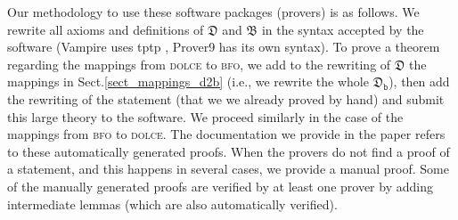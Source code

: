 \documentclass[ao]{iosart2x}
\newcommand{\nb}[1]{\textcolor{red}{$|$}\marginpar{\hspace*{-0cm}\parbox{20mm}{\scriptsize\raggedright\textcolor{red}{#1}}}}
\newcommand{\dolce}{{\textsc{dolce}}}
\newcommand{\bfo}{{\textsc{bfo}}}
\newcommand {\thdolce} {\ensuremath{\mathfrak{D}}}
\newcommand {\thbfo} {\ensuremath{\mathfrak{B}}}
\newcommand {\thdolcedbmap} {\ensuremath{\mathfrak{D}_\texttt{b}}}
\begin{document}

Our methodology to use these software packages (provers) is as follows. We rewrite all axioms and definitions of {$\thdolce$} and $\thbfo$ in the syntax accepted by the software (Vampire uses tptp \citep{Sut17}, Prover9 has its own syntax).
To prove a theorem regarding the mappings from {\dolce} to {\bfo}, we add to the rewriting of $\thdolce$ the mappings in Sect.\ref{sect_mappings_d2b} (i.e., we rewrite the whole $\thdolcedbmap$), then add the rewriting of the statement (that we we already proved by hand) and submit this large theory to the software. We proceed similarly in the case of the mappings from {\bfo} to {\dolce}. The documentation we provide in the paper refers to these automatically generated proofs.
When the provers do not find a proof of a statement, and this happens in several cases, we provide a manual proof. Some of the manually generated proofs are verified by at least one prover by adding intermediate lemmas (which are also automatically verified). %
\end{document}
